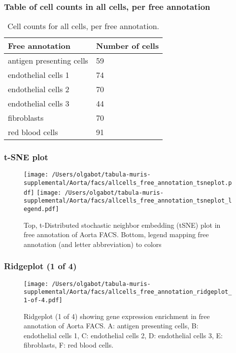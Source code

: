 \subsubsection{Table of cell counts in all cells, per free annotation}\begin{table}[h]
\centering
\label{my-label}
\begin{tabular}{@{}ll@{}}
\toprule

Free annotation& Number of cells \\ \midrule
antigen presenting cells & 59 \\

endothelial cells 1 & 74 \\

endothelial cells 2 & 70 \\

endothelial cells 3 & 44 \\

fibroblasts & 70 \\

red blood cells & 91 \\
\bottomrule
\end{tabular}
\caption{Cell counts for all cells, per free annotation.}
\end{table}

\clearpage
\subsubsection{t-SNE plot}
\begin{figure}[h]
\centering
\texttt{[image: /Users/olgabot/tabula-muris-supplemental/Aorta/facs/allcells\_free\_annotation\_tsneplot.pdf]}
\texttt{[image: /Users/olgabot/tabula-muris-supplemental/Aorta/facs/allcells\_free\_annotation\_tsneplot\_legend.pdf]}
\caption{Top, t-Distributed stochastic neighbor embedding (tSNE) plot  in free annotation of Aorta FACS. Bottom, legend mapping free annotation (and letter abbreviation) to colors}
\end{figure}


\clearpage
\clearpage
\subsubsection{Ridgeplot (1 of 4)}
\begin{figure}[h]
\centering
\texttt{[image: /Users/olgabot/tabula-muris-supplemental/Aorta/facs/allcells\_free\_annotation\_ridgeplot\_1-of-4.pdf]}

\caption{ Ridgeplot (1 of 4)  showing gene expression enrichment in free annotation of Aorta FACS. A: antigen presenting cells, B: endothelial cells 1, C: endothelial cells 2, D: endothelial cells 3, E: fibroblasts, F: red blood cells.}
\end{figure}


